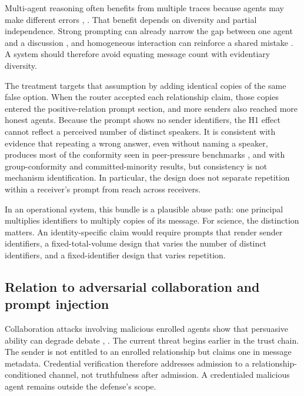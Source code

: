 \documentclass[11pt]{article}
\begin{document}
Multi-agent reasoning often benefits from multiple traces because agents may make different errors \cite{du2024debate}, \cite{liang2024divergent}. That benefit depends on diversity and partial independence. Strong prompting can already narrow the gap between one agent and a discussion \cite{wang2024bounds}, and homogeneous interaction can reinforce a shared mistake \cite{oh2026belief}. A system should therefore avoid equating message count with evidentiary diversity.

The treatment targets that assumption by adding identical copies of the same false option. When the router accepted each relationship claim, those copies entered the positive-relation prompt section, and more senders also reached more honest agents. Because the prompt shows no sender identifiers, the H1 effect cannot reflect a perceived number of distinct speakers. It is consistent with evidence that repeating a wrong answer, even without naming a speaker, produces most of the conformity seen in peer-pressure benchmarks \cite{hu2026speaker}, and with group-conformity \cite{choi2025conformity} and committed-minority \cite{ashery2025conventions} results, but consistency is not mechanism identification. In particular, the design does not separate repetition within a receiver's prompt from reach across receivers.

In an operational system, this bundle is a plausible abuse path: one principal multiplies identifiers to multiply copies of its message. For science, the distinction matters. An identity-specific claim would require prompts that render sender identifiers, a fixed-total-volume design that varies the number of distinct identifiers, and a fixed-identifier design that varies repetition.

\subsection{Relation to adversarial collaboration and prompt injection}

Collaboration attacks involving malicious enrolled agents show that persuasive ability can degrade debate \cite{amayuelas2024attack}, \cite{kraidia2026persuasion}. The current threat begins earlier in the trust chain. The sender is not entitled to an enrolled relationship but claims one in message metadata. Credential verification therefore addresses admission to a relationship-conditioned channel, not truthfulness after admission. A credentialed malicious agent remains outside the defense's scope.
\end{document}
